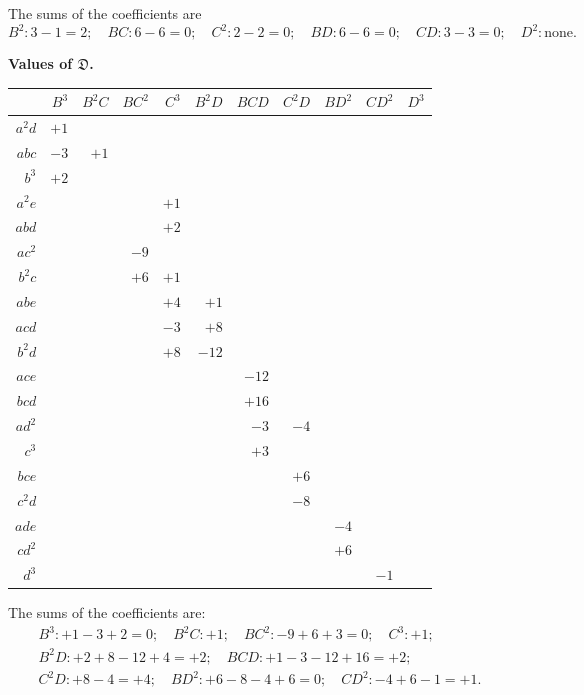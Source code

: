 \documentclass[11pt,a4paper]{article}
\theoremstyle{definition}
\begin{document}
The sums of the coefficients are
\[B^{2}: 3-1=2; \quad BC: 6-6=0; \quad C^{2}: 2-2=0; \quad BD: 6-6=0; \quad CD: 3-3=0; \quad D^{2}: \text{none.}\]

\newpage

\begin{center}
\renewcommand{\arraystretch}{1.2}
\textbf{Values of $\mathfrak{D}$.}
\begin{tabular}{r|rrrrrrrrrr}
& $B^{3}$ & $B^{2}C$ & $BC^{2}$ & $C^{3}$ & $B^{2}D$ & $BCD$ & $C^{2}D$ & $BD^{2}$ & $CD^{2}$ & $D^{3}$ \\
\hline
$a^{2}d$ & $+1$ \\
$abc$ & $-3$ & $+1$ \\
$b^{3}$ & $+2$ \\
$a^{2}e$ & & & & $+1$ \\
$abd$ & & & & $+2$ \\
$ac^{2}$ & & & $-9$ \\
$b^{2}c$ & & & $+6$ & $+1$ \\
$abe$ & & & & $+4$ & $+1$ \\
$acd$ & & & & $-3$ & $+8$ \\
$b^{2}d$ & & & & $+8$ & $-12$ \\
$ace$ & & & & & & $-12$ \\
$bcd$ & & & & & & $+16$ \\
$ad^{2}$ & & & & & & $-3$ & $-4$ \\
$c^{3}$ & & & & & & $+3$ \\
$bce$ & & & & & & & $+6$ \\
$c^{2}d$ & & & & & & & $-8$ \\
$ade$ & & & & & & & & $-4$ \\
$cd^{2}$ & & & & & & & & $+6$ \\
$d^{3}$ & & & & & & & & & $-1$
\end{tabular}
\end{center}

The sums of the coefficients are:
\begin{gather*}
B^{3}: +1-3+2=0; \quad B^{2}C: +1; \quad BC^{2}: -9+6+3=0; \quad C^{3}: +1; \\
B^{2}D: +2+8-12+4=+2; \quad BCD: +1-3-12+16=+2; \\
C^{2}D: +8-4=+4; \quad BD^{2}: +6-8-4+6=0; \quad CD^{2}: -4+6-1=+1.
\end{gather*}

\newpage
\end{document}
